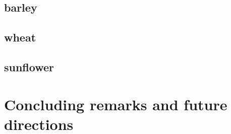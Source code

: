 \documentclass[11pt]{article}
\begin{document}
 
\subsection{barley}
\subsection{wheat}
\subsection{sunflower}

\section{Concluding remarks and future directions}



%
% 

\end{document}
